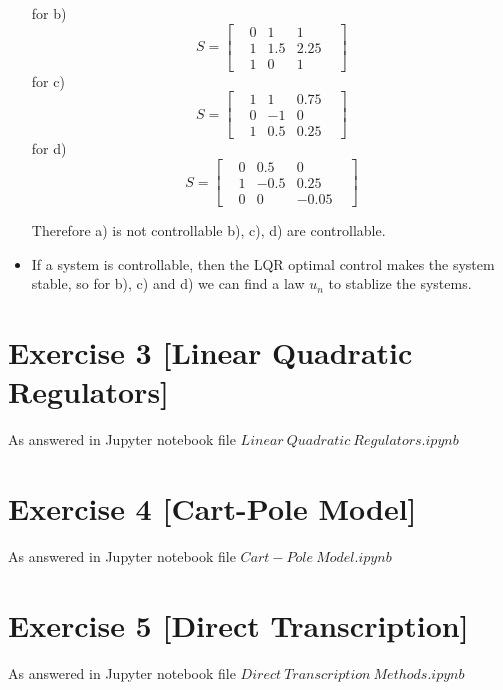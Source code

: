 \documentclass[11pt]{article}
\begin{document}
\begin{itemize}
  for b) 
  \begin{equation}
  S = \left[\begin{matrix} & 0 & 1 & 1 &\\ & 1 & 1.5 & 2.25 &\\ & 1 & 0 & 1 &\end{matrix}\right] \nonumber
  \end{equation}
  for c)
  \begin{equation}
  S = \left[\begin{matrix} & 1 & 1 & 0.75 &\\ & 0 & -1 & 0 &\\ & 1 & 0.5 & 0.25 &\end{matrix}\right] \nonumber
  \end{equation}
  for d)
  \begin{equation}
  S = \left[\begin{matrix} & 0 & 0.5 & 0 &\\ & 1 & -0.5 & 0.25 &\\ & 0 & 0 & -0.05 &\end{matrix}\right] \nonumber
  \end{equation}

  Therefore a) is not controllable b), c), d) are controllable.

  \item If a system is controllable, then the LQR optimal control makes the system stable, so for b), c) and d) we can find a
  law $u_n$ to stablize the systems.
\end{itemize}


\section*{Exercise 3 [Linear Quadratic Regulators]}

As answered in Jupyter notebook file $Linear\ Quadratic\ Regulators.ipynb$


\section*{Exercise 4 [Cart-Pole Model]}

As answered in Jupyter notebook file $Cart-Pole\ Model.ipynb$


\section*{Exercise 5 [Direct Transcription]}

As answered in Jupyter notebook file $Direct\ Transcription\ Methods.ipynb$
\end{document}
